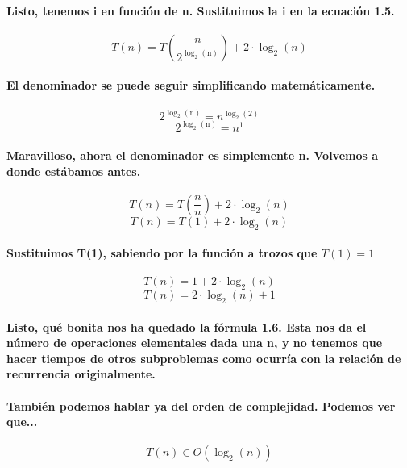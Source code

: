 \documentclass{book}
\begin{document}
	\paragraph{Listo, tenemos i en función de n. Sustituimos la i en la ecuación 1.5.}
	\begin{equation}
		T(n) = T(\frac{n}{2^\mathrm{\log_{2}(n)}}) + 2 \cdot \log_{2}(n)  \nonumber 
	\end{equation}
	\paragraph{El denominador se puede seguir simplificando matemáticamente.}
	\begin{equation}
		2^\mathrm{\log_{2}(n)} = n^\mathrm{\log_{2}(2)} \nonumber 
	\end{equation}
	\begin{equation}
		2^\mathrm{\log_{2}(n)} = n^1 \nonumber 
	\end{equation}
	\paragraph{Maravilloso, ahora el denominador es simplemente n. Volvemos a donde estábamos antes.}
	\begin{equation}
		T(n) = T(\frac{n}{n}) + 2 \cdot \log_{2}(n) \nonumber 
	\end{equation}
	\begin{equation}
		T(n) = T(1) + 2 \cdot \log_{2}(n) \nonumber 
	\end{equation}
	\paragraph{Sustituimos T(1), sabiendo por la función a trozos que $T(1) = 1$}
	\begin{equation}
		T(n) = 1 + 2 \cdot \log_{2}(n) \nonumber 
	\end{equation}
	\begin{equation}
		T(n) = 2 \cdot \log_{2}(n) + 1 
	\end{equation}
	\paragraph{Listo, qué bonita nos ha quedado la fórmula 1.6. Esta nos da el número de operaciones elementales dada una n, y no tenemos que hacer tiempos de otros subproblemas como ocurría con la relación de recurrencia originalmente.}
	\paragraph{También podemos hablar ya del orden de complejidad. Podemos ver que...}
	\begin{equation}
		T(n) \in O(\log_{2}(n)) \nonumber
	\end{equation}		
\end{document}
